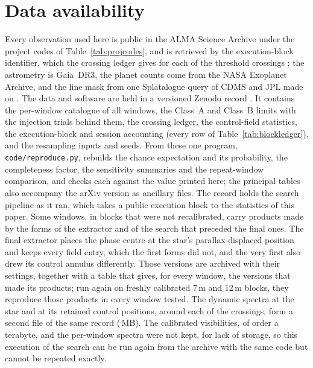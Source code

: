 \section*{Data availability}
\label{sec:data}
Every observation used here is public in the ALMA Science Archive under the
\NProjCodes{} project codes of Table~\ref{tab:projcodes}, and is retrieved by
the execution-block identifier, which the crossing ledger gives for each of the
\EvNCrossRaw{} threshold crossings \citep{Chen2022}; the astrometry is
Gaia~DR3, the planet counts come from the NASA Exoplanet Archive, and the line
mask from one Splatalogue query of CDMS and JPL made on \McQueryDate. The data
and software are held in a versioned Zenodo record \citep{SIdeposit}. It
contains the per-window catalogue of all \NWindows{} windows, the Class~A and
Class~B limits with the injection trials behind them, the crossing ledger, the
control-field statistics, the execution-block and session accounting (every
row of Table~\ref{tab:blockledger}), and the
resampling inputs and seeds. From these one program,
\texttt{code/reproduce.py}, rebuilds the chance expectation and its
probability, the completeness factor, the sensitivity summaries and the
repeat-window comparison, and checks each against the value printed here; the
principal tables also accompany the arXiv version as ancillary files. The
record holds the search pipeline as it ran, which takes a public execution
block to the statistics of this paper. Some windows, in blocks that were not
recalibrated, carry products made by the forms of the extractor and of the
search that preceded the final ones. The final extractor places the phase
centre at the star's parallax-displaced position and keeps every field entry,
which the first forms did not, and the very first also drew its control
annulus differently. Those versions are archived with their settings,
together with a table that gives, for every window, the versions that made
its products; run again on freshly calibrated 7\,m and 12\,m blocks, they
reproduce those products in every window tested. The dynamic spectra at the
star and at its \RcNRetCtrl{} retained control positions, around each of the
\DaNSpecCross{} crossings, form a second file of the same record
(\DaSpecFileMB\,MB). The calibrated visibilities, of order a terabyte, and the
per-window spectra were not kept, for lack of storage, so this execution of
the search can be run again from the archive with the same code but cannot be
repeated exactly.
